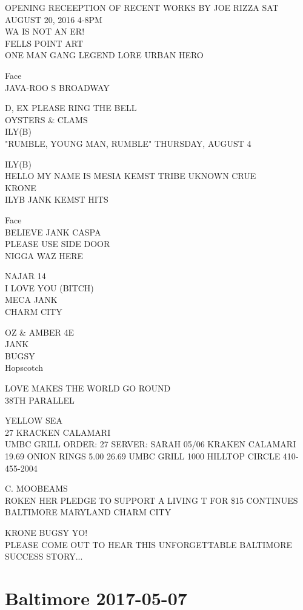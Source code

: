 \documentclass[10pt,letterpaper]{article}
\begin{document}
OPENING RECEEPTION OF RECENT WORKS BY JOE RIZZA SAT AUGUST 20, 2016 4{-}8PM\\
WA IS NOT AN ER!\\
FELLS POINT ART\\
ONE MAN GANG LEGEND LORE URBAN HERO

Face\\
JAVA{-}ROO S BROADWAY

D, EX PLEASE RING THE BELL\\
OYSTERS \& CLAMS\\
ILY(B)\\
"RUMBLE, YOUNG MAN, RUMBLE" THURSDAY, AUGUST 4

ILY(B)\\
HELLO MY NAME IS MESIA KEMST TRIBE UKNOWN CRUE\\
KRONE\\
ILYB JANK KEMST HITS

Face\\
BELIEVE JANK CASPA\\
PLEASE USE SIDE DOOR\\
NIGGA WAZ HERE

NAJAR 14\\
I LOVE YOU (BITCH)\\
MECA JANK\\
CHARM CITY

OZ \& AMBER 4E\\
JANK\\
BUGSY\\
Hopscotch

LOVE MAKES THE WORLD GO ROUND\\
38TH PARALLEL

YELLOW SEA\\
27 KRACKEN CALAMARI\\
UMBC GRILL ORDER: 27 SERVER: SARAH 05/06 KRAKEN CALAMARI 19.69 ONION RINGS 5.00 26.69 UMBC GRILL 1000 HILLTOP CIRCLE 410{-}455{-}2004

C. MOOBEAMS\\
ROKEN HER PLEDGE TO SUPPORT A LIVING T FOR \$15 CONTINUES\\
BALTIMORE MARYLAND CHARM CITY

KRONE BUGSY YO!\\
PLEASE COME OUT TO HEAR THIS UNFORGETTABLE BALTIMORE SUCCESS STORY...
\pagebreak

\section*{Baltimore 2017-05-07}
\end{document}
